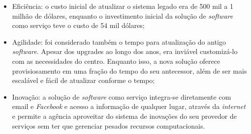 \begin{itemize}
    \item
    Eficiência: o custo inicial de atualizar o sistema legado era de 500 mil a 1 milhão
    de dólares, enquanto o investimento inicial da solução de \emph{software} como serviço
    teve o custo de 54 mil dólares;

    \item
    Agilidade: foi considerado também o tempo para atualização do antigo \emph{software}.
    Apesar dos upgrades ao longo dos anos, era inviável customizá-lo com as necessidades
    do centro. Enquanto isso, a nova solução oferece provisiosamento em uma fração do tempo
    do seu antecessor, além de ser mais escalável e fácil de atualizar conforme o tempo;

    \item
    Inovação: a solução de \emph{software} como serviço integra-se diretamente
    com email e \emph{Facebook} e acesso a informação de qualquer lugar, através
    da \emph{internet} e permite a agência aproveitar do sistema de inovações
    do seu provedor de serviços sem ter que gerenciar pesados recursos computacionais.

\end{itemize}

